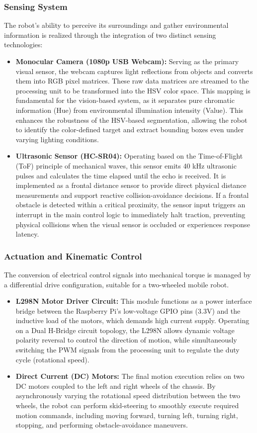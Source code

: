 \subsubsection{Sensing System}
The robot's ability to perceive its surroundings and gather environmental information is realized through the integration of two distinct sensing technologies:
\begin{itemize}
    \item \textbf{Monocular Camera (1080p USB Webcam):} Serving as the primary visual sensor, the webcam captures light reflections from objects and converts them into RGB pixel matrices. These raw data matrices are streamed to the processing unit to be transformed into the HSV color space. This mapping is fundamental for the vision-based system, as it separates pure chromatic information (Hue) from environmental illumination intensity (Value). This enhances the robustness of the HSV-based segmentation, allowing the robot to identify the color-defined target and extract bounding boxes even under varying lighting conditions.
    \item \textbf{Ultrasonic Sensor (HC-SR04):} Operating based on the Time-of-Flight (ToF) principle of mechanical waves, this sensor emits 40 kHz ultrasonic pulses and calculates the time elapsed until the echo is received. It is implemented as a frontal distance sensor to provide direct physical distance measurements and support reactive collision-avoidance decisions. If a frontal obstacle is detected within a critical proximity, the sensor input triggers an interrupt in the main control logic to immediately halt traction, preventing physical collisions when the visual sensor is occluded or experiences response latency.
\end{itemize}

\subsubsection{Actuation and Kinematic Control}
The conversion of electrical control signals into mechanical torque is managed by a differential drive configuration, suitable for a two-wheeled mobile robot.
\begin{itemize}
    \item \textbf{L298N Motor Driver Circuit:} This module functions as a power interface bridge between the Raspberry Pi's low-voltage GPIO pins (3.3V) and the inductive load of the motors, which demands high current supply. Operating on a Dual H-Bridge circuit topology, the L298N allows dynamic voltage polarity reversal to control the direction of motion, while simultaneously switching the PWM signals from the processing unit to regulate the duty cycle (rotational speed).
    \item \textbf{Direct Current (DC) Motors:} The final motion execution relies on two DC motors coupled to the left and right wheels of the chassis. By asynchronously varying the rotational speed distribution between the two wheels, the robot can perform skid-steering to smoothly execute required motion commands, including moving forward, turning left, turning right, stopping, and performing obstacle-avoidance maneuvers.
\end{itemize}


